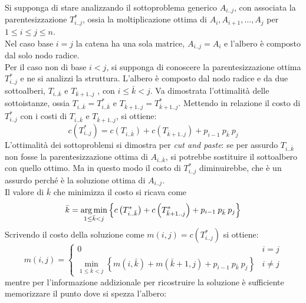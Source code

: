 Si supponga di stare analizzando il sottoproblema generico $A_{i..j}$, con associata la parentesizzazione $T_{i..j}^{*}$, ossia la moltiplicazione ottima di $A_i, A_{i+1},\ldots, A_j$ per $1 \leq i \leq j \leq n$.
\\
Nel caso base $i=j$ la catena ha una sola matrice, $A_{i..j} = A_i$ e l'albero è composto dal solo nodo radice.
\\
Per il caso non di base $i<j$, si supponga di conoscere la parentesizzazione ottima
$T_{i..j}^*$
e ne si analizzi la struttura. L'albero è composto dal nodo radice e da due sottoalberi, 
$T_{i.. \bar{k}}$
e
$T_{\bar{k}+1..j}$
, con $i \leq \bar{k} < j$. Va dimostrata l'ottimalità delle sottoistanze, ossia
$T_{i.. \bar{k}} = T_{i.. \bar{k}}^*$ e 
$T_{\bar{k}+1..j} = T_{\bar{k}+1..j}^*$.
Mettendo in relazione il costo di $T_{i..j}^*$ con i costi di $T_{i.. \bar{k}}$ e $T_{\bar{k}+1..j}$, si ottiene:
\begin{equation*}
    c \left( 
T_{i..j}^*
    \right)
    =
    c \left( 
T_{i.. \bar{k}}
    \right)
    +
    c \left( 
T_{\bar{k}+1..j}
    \right)
    + p_{i-1} \: p_{\bar{k}} \: p_j
\end{equation*}
L'ottimalità dei sottoproblemi si dimostra per \emph{cut and paste}: se per assurdo $ T_{i.. \bar{k}} $ non fosse la parentesizzazione ottima di $A_{i..\bar{k}}$, si potrebbe sostituire il sottoalbero con quello ottimo. Ma in questo modo il costo di $ T_{i..j}^* $ diminuirebbe, che è un assurdo perché è la soluzione ottima di $A_{i..j}$.
\\
Il valore di $\bar{k}$ che minimizza il costo si ricava come
\begin{equation*}
    \bar{k}
    =
    \operatorname*{arg\,min}_{1 \leq \bar{k} < j}
    \left\{ 
    c \left( 
    T_{i.. \bar{k}}^*
    \right)
    +
    c \left( 
    T_{\bar{k}+1..j}^*
    \right)
    + p_{i-1} \: p_{\bar{k}} \: p_j
    \right\}
\end{equation*}
Scrivendo il costo della soluzione come $m(i,j) = c\left( T_{i..j}^* \right)$ si ottiene:
\begin{equation*}
    m(i,j)
    =
    \begin{cases}
    0 & i=j \\    
    \displaystyle\min_{1 \leq \bar{k} < j}
    \left\{ 
    m(i, \bar{k})
    +
    m(\bar{k}+1,j)
    + p_{i-1} \: p_{\bar{k}} \: p_j
    \right\}
    & i \neq j
    \end{cases}
\end{equation*}
mentre per l'informazione addizionale per ricostruire la soluzione è sufficiente memorizzare il punto dove si spezza l'albero:
